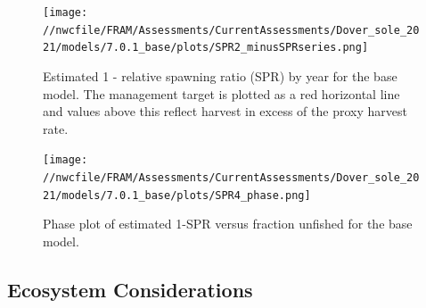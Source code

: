 \documentclass[11pt,
  english,
  a4paper,
]{article}
\begin{document}



\begin{figure}
\centering
\texttt{[image: //nwcfile/FRAM/Assessments/CurrentAssessments/Dover\_sole\_2021/models/7.0.1\_base/plots/SPR2\_minusSPRseries.png]}
\caption{Estimated 1 - relative spawning ratio (SPR) by year for the base model. The management target is plotted as a red horizontal line and values above this reflect harvest in excess of the proxy harvest rate.\label{fig:es-1-spr}}
\end{figure}

\tagmcend\tagstructend


\begin{figure}
\centering
\texttt{[image: //nwcfile/FRAM/Assessments/CurrentAssessments/Dover\_sole\_2021/models/7.0.1\_base/plots/SPR4\_phase.png]}
\caption{Phase plot of estimated 1-SPR versus fraction unfished for the base model.\label{fig:es-phase}}
\end{figure}

\tagmcend\tagstructend

\clearpage


\hypertarget{ecosystem-considerations}{%
\subsection*{Ecosystem Considerations}\label{ecosystem-considerations}}

\leavevmode\tagmcend\tagstructend

\end{document}
